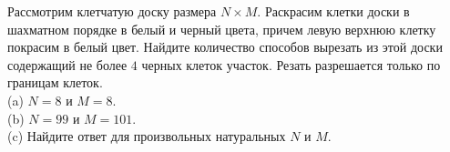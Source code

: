 \documentclass{article}
\begin{document}
Рассмотрим клетчатую доску размера $N\times M$. Раскрасим клетки доски в шахматном порядке в белый и черный цвета, причем 
левую верхнюю клетку покрасим в белый цвет. Найдите количество способов вырезать из этой доски содержащий не более $4$ черных клеток участок. Резать разрешается только по границам клеток.\\
(a) $N=8$ и $M=8$.\\
(b) $N=99$ и $M=101$.\\
(c) Найдите ответ для произвольных натуральных $N$ и $M$.
\end{document}
